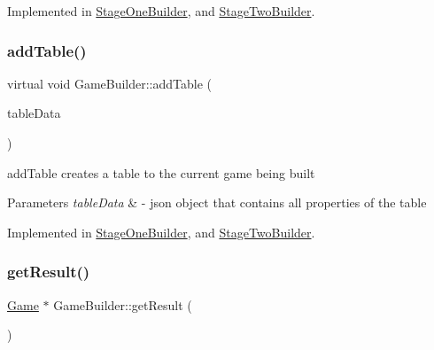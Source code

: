 Implemented in \mbox{\hyperlink{class_stage_one_builder_a9d7931aab89afcfa0b2c23da6fb10bfb}{Stage\+One\+Builder}}, and \mbox{\hyperlink{class_stage_two_builder_a8b2b783294c26b5f40d16bdd54d86301}{Stage\+Two\+Builder}}.

\mbox{\label{class_game_builder_a65fb629009c18956a8d592352eda1eb5}} 
\subsubsection{\texorpdfstring{add\+Table()}{addTable()}}
{\footnotesize\ttfamily virtual void Game\+Builder\+::add\+Table (\begin{DoxyParamCaption}\item[{Q\+Json\+Object \&}]{table\+Data }\end{DoxyParamCaption})\hspace{0.3cm}{\ttfamily [pure virtual]}}



add\+Table creates a table to the current game being built 


\begin{DoxyParams}{Parameters}
{\em table\+Data} & -\/ json object that contains all properties of the table \\
\hline
\end{DoxyParams}


Implemented in \mbox{\hyperlink{class_stage_one_builder_ac8f35ec11ebe31010410bc50b0149ce9}{Stage\+One\+Builder}}, and \mbox{\hyperlink{class_stage_two_builder_a7326ee514e752cab6d994352f5ef68e0}{Stage\+Two\+Builder}}.

\mbox{\label{class_game_builder_a490e3dbb7f8289edb2a080a3383f8607}} 
\subsubsection{\texorpdfstring{get\+Result()}{getResult()}}
{\footnotesize\ttfamily \mbox{\hyperlink{class_game}{Game}} $\ast$ Game\+Builder\+::get\+Result (\begin{DoxyParamCaption}{ }\end{DoxyParamCaption})\hspace{0.3cm}{\ttfamily [virtual]}}



